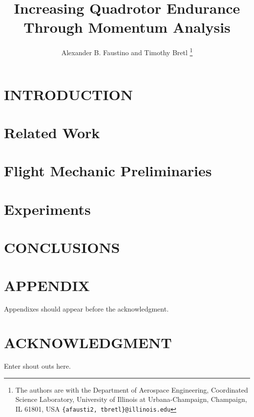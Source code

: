 \documentclass[letterpaper, 10 pt, conference]{ieeeconf}  %
\title{\LARGE \bf
Increasing Quadrotor Endurance Through Momentum Analysis
}
\author{Alexander B. Faustino and Timothy Bretl%
	\thanks{The authors are with the Department of Aerospace Engineering, Coordinated Science Laboratory, 
		University of Illinois at Urbana-Champaign, Champaign, IL 61801, USA
		\tt\small \{afausti2, tbretl\}@illinois.edu}%
}
\begin{document}
\maketitle
\thispagestyle{empty}
\pagestyle{empty}





\section{INTRODUCTION}


\section{Related Work}


\section{Flight Mechanic Preliminaries}
\label{flightMechSec}
\label{derivations}


\section{Experiments}


\section{CONCLUSIONS}




\section*{APPENDIX}

Appendixes should appear before the acknowledgment.

\section*{ACKNOWLEDGMENT}

Enter shout outs here.



\end{document}
